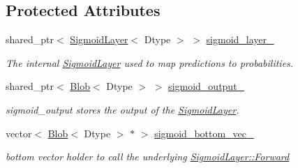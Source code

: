 \subsection*{Protected Attributes}
\begin{DoxyCompactItemize}
\item 
\mbox{\label{classcaffe_1_1_sigmoid_cross_entropy_loss_layer_a8dc9c17e12483369f39da936f3062f86}} 
shared\+\_\+ptr$<$ \mbox{\hyperlink{classcaffe_1_1_sigmoid_layer}{Sigmoid\+Layer}}$<$ Dtype $>$ $>$ \mbox{\hyperlink{classcaffe_1_1_sigmoid_cross_entropy_loss_layer_a8dc9c17e12483369f39da936f3062f86}{sigmoid\+\_\+layer\+\_\+}}
\begin{DoxyCompactList}\small\item\em The internal \mbox{\hyperlink{classcaffe_1_1_sigmoid_layer}{Sigmoid\+Layer}} used to map predictions to probabilities. \end{DoxyCompactList}\item 
\mbox{\label{classcaffe_1_1_sigmoid_cross_entropy_loss_layer_afb2125344c21f5d9627077b1ba741972}} 
shared\+\_\+ptr$<$ \mbox{\hyperlink{classcaffe_1_1_blob}{Blob}}$<$ Dtype $>$ $>$ \mbox{\hyperlink{classcaffe_1_1_sigmoid_cross_entropy_loss_layer_afb2125344c21f5d9627077b1ba741972}{sigmoid\+\_\+output\+\_\+}}
\begin{DoxyCompactList}\small\item\em sigmoid\+\_\+output stores the output of the \mbox{\hyperlink{classcaffe_1_1_sigmoid_layer}{Sigmoid\+Layer}}. \end{DoxyCompactList}\item 
\mbox{\label{classcaffe_1_1_sigmoid_cross_entropy_loss_layer_aeca896f5095bdd6e862645e0dba99352}} 
vector$<$ \mbox{\hyperlink{classcaffe_1_1_blob}{Blob}}$<$ Dtype $>$ $\ast$ $>$ \mbox{\hyperlink{classcaffe_1_1_sigmoid_cross_entropy_loss_layer_aeca896f5095bdd6e862645e0dba99352}{sigmoid\+\_\+bottom\+\_\+vec\+\_\+}}
\begin{DoxyCompactList}\small\item\em bottom vector holder to call the underlying \mbox{\hyperlink{classcaffe_1_1_layer_ab57d272dabe8c709d2a785eebe72ca57}{Sigmoid\+Layer\+::\+Forward}} \end{DoxyCompactList}\item 
\mbox{\label{classcaffe_1_1_sigmoid_cross_entropy_loss_layer_af484b314eb460e0a732c9dc7fccec8ae}} 

\end{DoxyCompactItemize}
